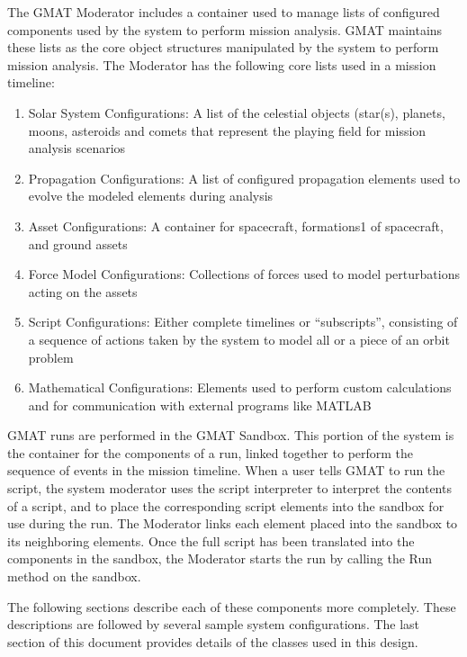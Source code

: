 The GMAT Moderator includes a container used to manage lists of configured components used by the
system to perform mission analysis.  GMAT maintains these lists as the core object structures
manipulated by the system to perform mission analysis.  The Moderator has the following core lists
used in a mission timeline:

\begin{enumerate}
\item Solar System Configurations: A list of the celestial objects (star(s), planets, moons,
asteroids and comets that represent the playing field for mission analysis scenarios
\item Propagation Configurations: A list of configured propagation elements used to evolve the
modeled elements during analysis
\item Asset Configurations: A container for spacecraft, formations1 of spacecraft, and ground assets
\item Force Model Configurations: Collections of forces used to model perturbations acting on the
assets
\item Script Configurations: Either complete timelines or ``subscripts'', consisting of a sequence
of actions taken by the system to model all or a piece of an orbit problem
\item Mathematical Configurations: Elements used to perform custom calculations and for
communication with external programs like MATLAB
\end{enumerate}

GMAT runs are performed in the GMAT Sandbox.  This portion of the system is the container for the
components of a run, linked together to perform the sequence of events in the mission timeline. When
a user tells GMAT to run the script, the system moderator uses the script interpreter to interpret
the contents of a script, and to place the corresponding script elements into the sandbox for use
during the run.  The Moderator links each element placed into the sandbox to its neighboring
elements.  Once the full script has been translated into the components in the sandbox, the
Moderator starts the run by calling the Run method on the sandbox.

The following sections describe each of these components more completely.  These descriptions are
followed by several sample system configurations.  The last section of this document provides
details of the classes used in this design.



